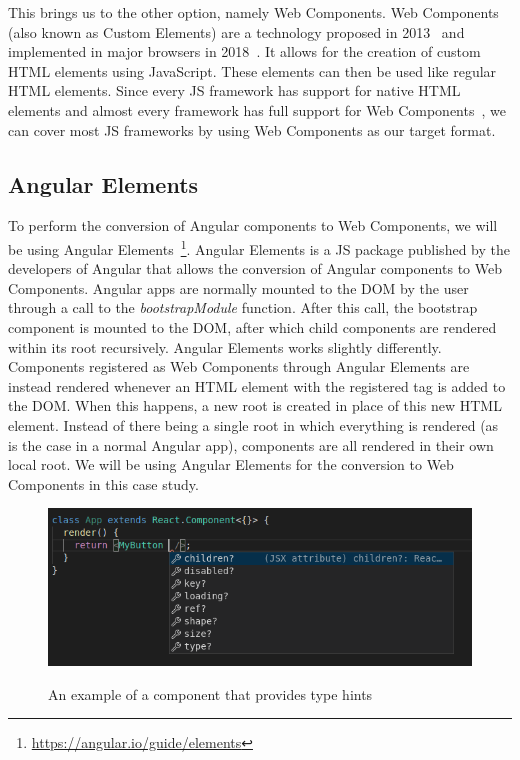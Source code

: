 This brings us to the other option, namely Web Components. Web Components (also known as Custom Elements) are a technology proposed in 2013~\cite{customelements-initial} and implemented in major browsers in 2018~\cite{webcomponents-support}. It allows for the creation of custom HTML elements using JavaScript. These elements can then be used like regular HTML elements. Since every JS framework has support for native HTML elements and almost every framework has full support for Web Components~\cite{custom-elements-everyhwere}, we can cover most JS frameworks by using Web Components as our target format.

\subsection{Angular Elements}\label{sec:bg:angularelements}
To perform the conversion of Angular components to Web Components, we will be using Angular Elements~\footnote{\url{https://angular.io/guide/elements}}. Angular Elements is a JS package published by the developers of Angular that allows the conversion of Angular components to Web Components. Angular apps are normally mounted to the DOM by the user through a call to the \emph{bootstrapModule} function. After this call, the bootstrap component is mounted to the DOM, after which child components are rendered within its root recursively. Angular Elements works slightly differently. Components registered as Web Components through Angular Elements are instead rendered whenever an HTML element with the registered tag is added to the DOM\@. When this happens, a new root is created in place of this new HTML element. Instead of there being a single root in which everything is rendered (as is the case in a normal Angular app), components are all rendered in their own local root. We will be using Angular Elements for the conversion to Web Components in this case study.

\begin{figure}[h]
	\caption{An example of a component that provides type hints}
	\includegraphics[width=\columnwidth]{figures/background/hinting.png}
	\label{fig:bg:hinting}
	\centering
\end{figure}


